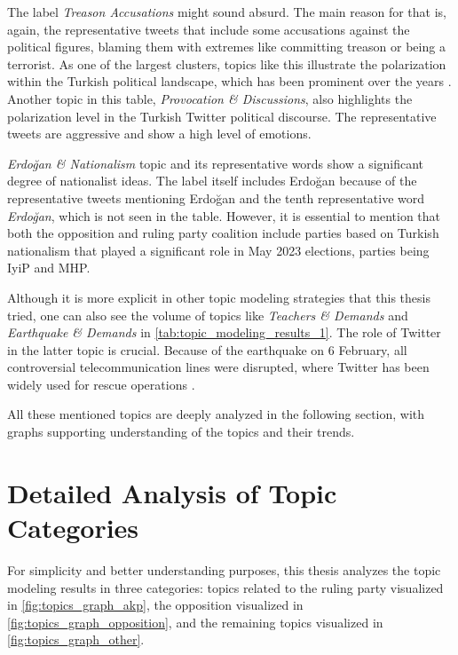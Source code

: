 The label \textit{Treason Accusations} might sound absurd. The main reason for that is, again, 
the representative tweets that include some accusations against the political figures, 
blaming them with extremes like committing treason or being a terrorist. As one of the largest 
clusters, topics like this illustrate the polarization within the Turkish political landscape, 
which has been prominent over the years \parencite{cevik_turkey_polarization_2018}. 
Another topic in this table, \textit{Provocation \& Discussions}, also highlights the 
polarization level in the Turkish Twitter political discourse. The representative tweets are 
aggressive and show a high level of emotions.

\textit{Erdoğan \& Nationalism} topic and its representative words show a significant degree 
of nationalist ideas. The label itself includes Erdoğan because of the representative tweets 
mentioning Erdoğan and the tenth representative word \textit{Erdoğan}, which is not seen in the table. 
However, it is essential to mention that both the opposition and ruling party coalition 
include parties based on Turkish nationalism that played a significant role in May 2023 
elections, parties being \ac{IyiP} and \ac{MHP}.

Although it is more explicit in other topic modeling strategies that this thesis tried, 
one can also see the volume of topics like \textit{Teachers \& Demands} and \textit{Earthquake \& Demands} 
in \autoref{tab:topic_modeling_results_1}. The role of Twitter in the latter topic is crucial. 
Because of the earthquake on 6 February, all controversial telecommunication lines were disrupted, 
where Twitter has been widely used for rescue operations \parencite{cevik_aksoy_turkey_earthquake_2023}.

All these mentioned topics are deeply analyzed in the following section, with 
graphs supporting understanding of the topics and their trends.

\section{Detailed Analysis of Topic Categories}

For simplicity and better understanding purposes, this thesis analyzes the topic modeling results 
in three categories: topics related to the ruling party visualized in \autoref{fig:topics_graph_akp}, 
the opposition visualized in \autoref{fig:topics_graph_opposition}, and the remaining topics 
visualized in \autoref{fig:topics_graph_other}. 

